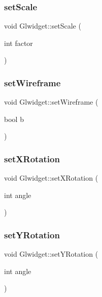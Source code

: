\subsubsection{\texorpdfstring{set\+Scale}{setScale}}
{\footnotesize\ttfamily void Glwidget\+::set\+Scale (\begin{DoxyParamCaption}\item[{int}]{factor }\end{DoxyParamCaption})\hspace{0.3cm}{\ttfamily [slot]}}

\mbox{\label{class_glwidget_a52a956313956890bf13741c218f8fa3d}} 
\subsubsection{\texorpdfstring{set\+Wireframe}{setWireframe}}
{\footnotesize\ttfamily void Glwidget\+::set\+Wireframe (\begin{DoxyParamCaption}\item[{bool}]{b }\end{DoxyParamCaption})\hspace{0.3cm}{\ttfamily [slot]}}

\mbox{\label{class_glwidget_abdb807d1e98041d3813543dd2f043d9e}} 
\subsubsection{\texorpdfstring{set\+X\+Rotation}{setXRotation}}
{\footnotesize\ttfamily void Glwidget\+::set\+X\+Rotation (\begin{DoxyParamCaption}\item[{int}]{angle }\end{DoxyParamCaption})\hspace{0.3cm}{\ttfamily [slot]}}

\mbox{\label{class_glwidget_a980d52bca9bf5817911029877a68e584}} 
\subsubsection{\texorpdfstring{set\+Y\+Rotation}{setYRotation}}
{\footnotesize\ttfamily void Glwidget\+::set\+Y\+Rotation (\begin{DoxyParamCaption}\item[{int}]{angle }\end{DoxyParamCaption})\hspace{0.3cm}{\ttfamily [slot]}}

